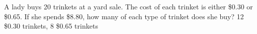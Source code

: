 {A lady buys 20 trinkets at a yard sale. The cost of each trinket is either \$0.30 or \$0.65. If she spends \$8.80, how many of each type of trinket does she buy?}
{12 \$0.30 trinkets, 8 \$0.65 trinkets}